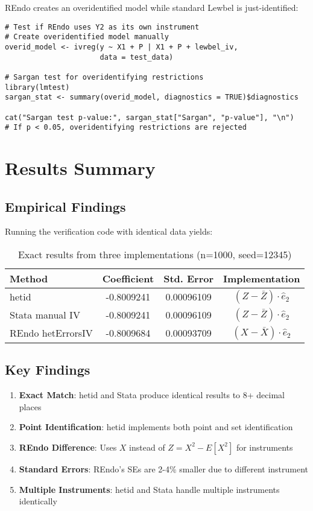 \documentclass[12pt]{article}
\begin{document}
REndo creates an overidentified model while standard Lewbel is just-identified:

\begin{lstlisting}[caption={Testing overidentification}]
# Test if REndo uses Y2 as its own instrument
# Create overidentified model manually
overid_model <- ivreg(y ~ X1 + P | X1 + P + lewbel_iv, 
                      data = test_data)

# Sargan test for overidentifying restrictions
library(lmtest)
sargan_stat <- summary(overid_model, diagnostics = TRUE)$diagnostics

cat("Sargan test p-value:", sargan_stat["Sargan", "p-value"], "\n")
# If p < 0.05, overidentifying restrictions are rejected
\end{lstlisting}

\section{Results Summary}

\subsection{Empirical Findings}

Running the verification code with identical data yields:

\begin{table}[h]
\centering
\begin{tabular}{lccc}
\toprule
Method & Coefficient & Std. Error & Implementation \\
\midrule
hetid & -0.8009241 & 0.00096109 & $(Z - \bar{Z}) \cdot \hat{e}_2$ \\
Stata manual IV & -0.8009241 & 0.00096109 & $(Z - \bar{Z}) \cdot \hat{e}_2$ \\
REndo hetErrorsIV & -0.8009684 & 0.00093709 & $(X - \bar{X}) \cdot \hat{e}_2$ \\
\bottomrule
\end{tabular}
\caption{Exact results from three implementations (n=1000, seed=12345)}
\end{table}

\subsection{Key Findings}

\begin{enumerate}
\item \textbf{Exact Match}: hetid and Stata produce identical results to 8+ decimal places
\item \textbf{Point Identification}: hetid implements both point and set identification
\item \textbf{REndo Difference}: Uses $X$ instead of $Z = X^2 - E[X^2]$ for instruments
\item \textbf{Standard Errors}: REndo's SEs are 2-4\% smaller due to different instrument
\item \textbf{Multiple Instruments}: hetid and Stata handle multiple instruments identically
\end{enumerate}
\end{document}
